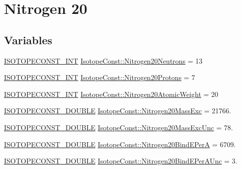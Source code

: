 \hypertarget{group___isotope_const-_nitrogen-_n20}{}\section{Nitrogen 20}
\label{group___isotope_const-_nitrogen-_n20}
\subsection*{Variables}
\begin{DoxyCompactItemize}
\item 
\mbox{\hyperlink{group___isotope_const-_macros_ga5f18360b3e99483a35c32d789e62621c}{I\+S\+O\+T\+O\+P\+E\+C\+O\+N\+S\+T\+\_\+\+I\+NT}} \mbox{\hyperlink{group___isotope_const-_nitrogen-_n20_ga261aaafe98cca7cd299652eccf06fb32}{Isotope\+Const\+::\+Nitrogen20\+Neutrons}} = 13
\item 
\mbox{\hyperlink{group___isotope_const-_macros_ga5f18360b3e99483a35c32d789e62621c}{I\+S\+O\+T\+O\+P\+E\+C\+O\+N\+S\+T\+\_\+\+I\+NT}} \mbox{\hyperlink{group___isotope_const-_nitrogen-_n20_ga87fa10f9fb74ac6a665400cefba57152}{Isotope\+Const\+::\+Nitrogen20\+Protons}} = 7
\item 
\mbox{\hyperlink{group___isotope_const-_macros_ga5f18360b3e99483a35c32d789e62621c}{I\+S\+O\+T\+O\+P\+E\+C\+O\+N\+S\+T\+\_\+\+I\+NT}} \mbox{\hyperlink{group___isotope_const-_nitrogen-_n20_ga6809e496dfd0bb38c524583c1b0d2858}{Isotope\+Const\+::\+Nitrogen20\+Atomic\+Weight}} = 20
\item 
\mbox{\hyperlink{group___isotope_const-_macros_ga8f45a7272ce02c0b4c65c44636ed719a}{I\+S\+O\+T\+O\+P\+E\+C\+O\+N\+S\+T\+\_\+\+D\+O\+U\+B\+LE}} \mbox{\hyperlink{group___isotope_const-_nitrogen-_n20_ga0ee43d57390b3aa609b31ac70e9b5c5f}{Isotope\+Const\+::\+Nitrogen20\+Mass\+Exc}} = 21766.
\item 
\mbox{\hyperlink{group___isotope_const-_macros_ga8f45a7272ce02c0b4c65c44636ed719a}{I\+S\+O\+T\+O\+P\+E\+C\+O\+N\+S\+T\+\_\+\+D\+O\+U\+B\+LE}} \mbox{\hyperlink{group___isotope_const-_nitrogen-_n20_ga675075c0e1d1075c131cbedbb36c3c18}{Isotope\+Const\+::\+Nitrogen20\+Mass\+Exc\+Unc}} = 78.
\item 
\mbox{\hyperlink{group___isotope_const-_macros_ga8f45a7272ce02c0b4c65c44636ed719a}{I\+S\+O\+T\+O\+P\+E\+C\+O\+N\+S\+T\+\_\+\+D\+O\+U\+B\+LE}} \mbox{\hyperlink{group___isotope_const-_nitrogen-_n20_ga18ef4c93b32c9fe3d25929cba14f5023}{Isotope\+Const\+::\+Nitrogen20\+Bind\+E\+PerA}} = 6709.
\item 
\mbox{\hyperlink{group___isotope_const-_macros_ga8f45a7272ce02c0b4c65c44636ed719a}{I\+S\+O\+T\+O\+P\+E\+C\+O\+N\+S\+T\+\_\+\+D\+O\+U\+B\+LE}} \mbox{\hyperlink{group___isotope_const-_nitrogen-_n20_ga6e19b06cdd577eb5e6f3efd317984a14}{Isotope\+Const\+::\+Nitrogen20\+Bind\+E\+Per\+A\+Unc}} = 3.

\end{DoxyCompactItemize}
